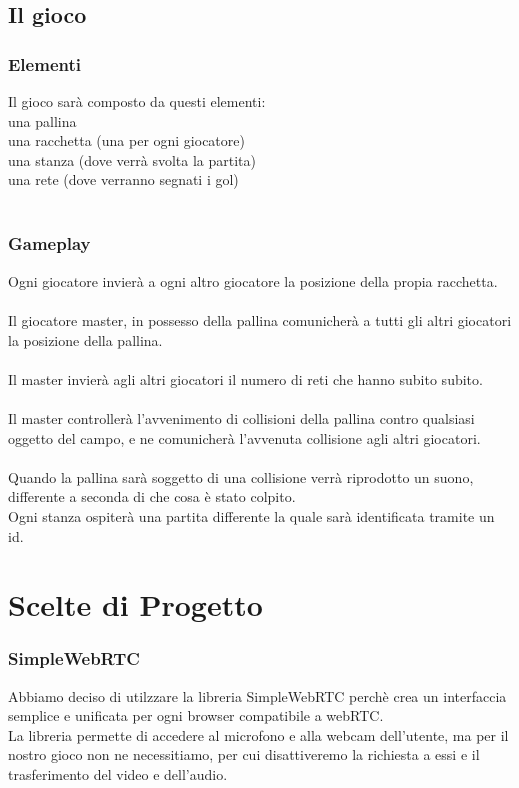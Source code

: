 \documentclass[11pt, a4paper, titlepage, block]{article}
\begin{document}
\newpage
	\subsection{Il gioco}
		\subsubsection{Elementi}
Il gioco sar\`a composto da questi elementi:\\
una pallina\\
una racchetta (una per ogni giocatore)\\
una stanza (dove verr\`a svolta la partita)\\
una rete (dove verranno segnati i gol)\\
\\
		\subsubsection{Gameplay}
Ogni giocatore invier\`a a ogni altro giocatore la posizione della propia racchetta.\\
\\
Il giocatore master, in possesso della pallina comunicher\`a a tutti gli altri giocatori la posizione della pallina.\\
\\
Il master invier\`a agli altri giocatori il numero di reti che hanno subito subito.\\
\\
Il master controller\`a l'avvenimento di collisioni della pallina contro qualsiasi oggetto del campo, e ne comunicher\`a l'avvenuta collisione agli altri giocatori.\\
\\
Quando la pallina sar\`a soggetto di una collisione verr\`a riprodotto un suono, differente a seconda di che cosa \`e stato colpito.
\\
Ogni stanza ospiter\`a una partita differente la quale sar\`a identificata tramite un id.\\
\newpage
\section{Scelte di Progetto}
	\subsubsection{SimpleWebRTC}
	Abbiamo deciso di utilzzare la libreria SimpleWebRTC perch\`e crea un interfaccia semplice e unificata per   
	ogni browser compatibile a webRTC.\\
	La libreria permette di accedere al microfono e alla webcam dell'utente, ma per il nostro gioco
	non ne necessitiamo, per cui disattiveremo la richiesta a essi e il trasferimento del video e dell'audio.
\end{document}
